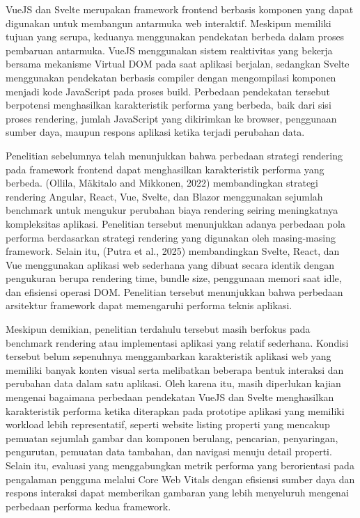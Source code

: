 \documentclass[12pt,a4paper]{report}
\begin{document}
VueJS dan Svelte merupakan framework frontend berbasis komponen yang dapat digunakan untuk membangun antarmuka web interaktif. Meskipun memiliki tujuan yang serupa, keduanya menggunakan pendekatan berbeda dalam proses pembaruan antarmuka. VueJS menggunakan sistem reaktivitas yang bekerja bersama mekanisme Virtual DOM pada saat aplikasi berjalan, sedangkan Svelte menggunakan pendekatan berbasis compiler dengan mengompilasi komponen menjadi kode JavaScript pada proses build. Perbedaan pendekatan tersebut berpotensi menghasilkan karakteristik performa yang berbeda, baik dari sisi proses rendering, jumlah JavaScript yang dikirimkan ke browser, penggunaan sumber daya, maupun respons aplikasi ketika terjadi perubahan data.

Penelitian sebelumnya telah menunjukkan bahwa perbedaan strategi rendering pada framework frontend dapat menghasilkan karakteristik performa yang berbeda. (Ollila, M\"akitalo and Mikkonen, 2022) membandingkan strategi rendering Angular, React, Vue, Svelte, dan Blazor menggunakan sejumlah benchmark untuk mengukur perubahan biaya rendering seiring meningkatnya kompleksitas aplikasi. Penelitian tersebut menunjukkan adanya perbedaan pola performa berdasarkan strategi rendering yang digunakan oleh masing-masing framework. Selain itu, (Putra et al., 2025) membandingkan Svelte, React, dan Vue menggunakan aplikasi web sederhana yang dibuat secara identik dengan pengukuran berupa rendering time, bundle size, penggunaan memori saat idle, dan efisiensi operasi DOM. Penelitian tersebut menunjukkan bahwa perbedaan arsitektur framework dapat memengaruhi performa teknis aplikasi.

Meskipun demikian, penelitian terdahulu tersebut masih berfokus pada benchmark rendering atau implementasi aplikasi yang relatif sederhana. Kondisi tersebut belum sepenuhnya menggambarkan karakteristik aplikasi web yang memiliki banyak konten visual serta melibatkan beberapa bentuk interaksi dan perubahan data dalam satu aplikasi. Oleh karena itu, masih diperlukan kajian mengenai bagaimana perbedaan pendekatan VueJS dan Svelte menghasilkan karakteristik performa ketika diterapkan pada prototipe aplikasi yang memiliki workload lebih representatif, seperti website listing properti yang mencakup pemuatan sejumlah gambar dan komponen berulang, pencarian, penyaringan, pengurutan, pemuatan data tambahan, dan navigasi menuju detail properti. Selain itu, evaluasi yang menggabungkan metrik performa yang berorientasi pada pengalaman pengguna melalui Core Web Vitals dengan efisiensi sumber daya dan respons interaksi dapat memberikan gambaran yang lebih menyeluruh mengenai perbedaan performa kedua framework.
\end{document}
